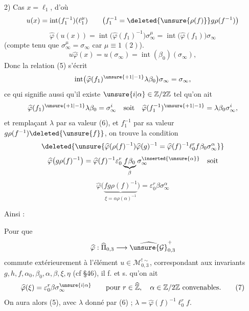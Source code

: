 2) Cas $x=\ell_1$, d'où
\[
u(x)=\operatorname{int}(f_1^{-1})(\ell_1^\mu)
\qquad\bigl(f_1^{-1}=\deleted{\unsure{\rho(f)}}g\rho(f^{-1})\bigr)
\]
\[
\widehat\varphi(u(x))=\operatorname{int}\bigl(\widehat\varphi(f_1)^{-1}\bigr)\sigma_\infty^\mu=\operatorname{int}\bigl(\widehat\varphi(f_1)\bigr)\sigma_\infty
\]
(compte tenu que $\sigma_\infty^\mu=\sigma_\infty$ car $\mu\equiv1\ (2)$).
\[
u\widehat\varphi(x)=u(\sigma_\infty)=\operatorname{int}(\beta_0)(\sigma_\infty),
\]
Donc la relation (5) s'écrit
\[
\operatorname{int}\bigl(\widehat\varphi(f_1)^{\unsure{+1|-1}}\lambda\beta_0\bigr)\sigma_\infty=\sigma_\infty,
\]
ce qui signifie aussi qu'il existe $\unsure{i|\alpha}\in\mathbb Z/2\mathbb Z$ tel qu'on ait
\[
\widehat\varphi(f_1)^{\unsure{+1|-1}}\lambda\beta_0=\sigma_\infty^i
\quad\text{soit}\quad
\widehat\varphi(f_1^{-1})^{\unsure{+1|-1}}=\lambda\beta_0\sigma_\infty^i,
\]
et remplaçant $\lambda$ par sa valeur (6), et $f_1^{-1}$ par sa valeur $g\rho(f^{-1})\deleted{\unsure{f}}$, on trouve la condition
\[
\deleted{\unsure{\widehat\varphi(\rho(f)^{-1})\widehat\varphi(g)^{-1}=\widehat\varphi(f)^{-1}\ell_0^r f\beta_0\sigma_\infty^\alpha}}
\]
\[
\widehat\varphi\bigl(g\rho(f)^{-1}\bigr)=\widehat\varphi(f)^{-1}\varepsilon_0^r\underbrace{f\beta_0}_{\beta}\sigma_\infty^{\inserted{\unsure{\alpha}}}\quad\text{soit}
\]
\[
\widehat\varphi\bigl(\underbrace{fg\rho(f)^{-1}}_{\xi=\alpha\rho(\alpha)^{-1}}\bigr)=\varepsilon_0^r\beta\sigma_\infty^\alpha
\]


Ainsi :

\uline{} Pour que
\[
\widehat\varphi:\widehat\Pi_{0,3}\longrightarrow
\widehat{\unsure{\mathcal G}}_{0,3}^{+}
\]
commute extérieurement à l'élément
$u\in\mathcal M_{0,3}^{!\sim}$, correspondant aux invariants
$g,h,f,\alpha_0,\beta_0,\alpha,\beta,\xi,\eta$ (cf \S 46),
il f. et s. qu'on ait
\[
\widehat\varphi(\xi)=\varepsilon_0^r\beta\sigma_\infty^{\unsure{i|\alpha}}
\qquad\text{pour }r\in\widehat{\mathbb Z},\quad
\alpha\in\mathbb Z/2\mathbb Z\ \text{convenables}.
\tag{7}
\]
On aura alors (5), avec 
$\lambda$ donné par (6) ;
$\lambda=\widehat\varphi(f)^{-1}\ell_0^r f$.

